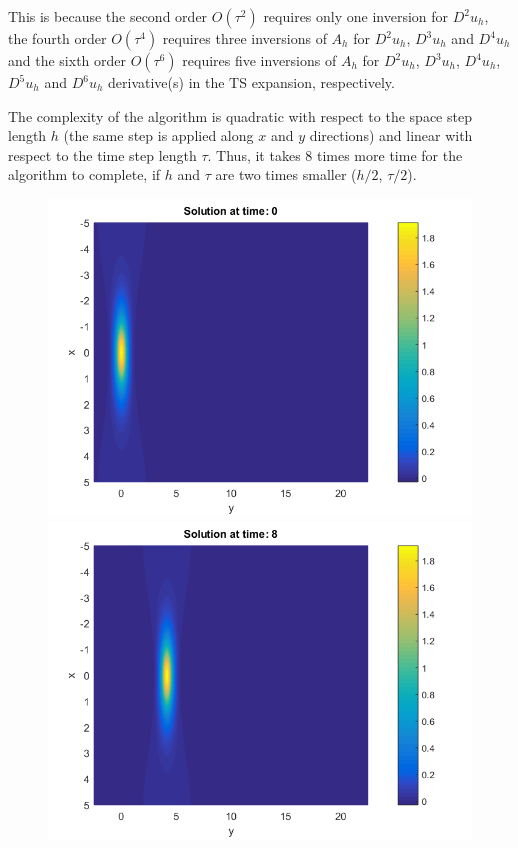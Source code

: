 \documentclass[11pt,a4paper,twoside]{article}
\begin{document}
This is because the second order $O(\tau^2)$ requires only one inversion for $D^2 u_h$, the fourth order $O(\tau^4)$ requires three inversions of $A_h$ for $D^2 u_h$, $D^3 u_h$ and $D^4 u_h$ and the sixth order $O(\tau^6)$ requires five inversions of $A_h$ for $D^2 u_h$, $D^3 u_h$, $D^4 u_h$, $D^5 u_h$ and $D^6 u_h$ derivative(s) in the TS expansion, respectively.

The complexity of the algorithm is quadratic with respect to the space step length $h$ (the same step is applied along $x$ and $y$ directions) and linear with respect to the time step length $\tau$. Thus, it takes 8 times more time for the algorithm to complete, if $h$ and $\tau$ are two times smaller ($h/2$, $\tau/2$).
\begin{figure}[!htbp]
	\centering
	\begin{minipage}[b]{0.31\linewidth}
		\includegraphics[width=\linewidth]{Pictures/Solution_bt3_t=0.png}
	\end{minipage}	
	\begin{minipage}[b]{0.31\linewidth}
		\includegraphics[width=\linewidth]{Pictures/Solution_bt3_t=8.png}

\end{minipage}
\end{figure}
\end{document}
